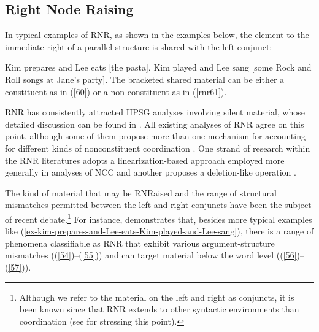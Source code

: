 {\subsection{Right Node Raising}

In typical examples of RNR, as shown in the examples below, the element to the immediate right of a parallel structure is shared with the left conjunct:

\eal
\label{ex-kim-prepares-and-Lee-eats-Kim-played-and-Lee-sang}
\ex  Kim prepares and Lee eats [the pasta].  \label{60}
\ex  Kim played and Lee sang [some Rock and Roll songs at Jane's party]. \label{rnr61}
\zl
%
The bracketed shared material can be either a constituent as in (\ref{60}) or a non-constituent as in (\ref{rnr61}).

RNR has consistently attracted HPSG analyses involving silent material, whose detailed discussion can be found
in . 
All existing analyses of RNR \citep{Abeille2016, Beavers2004, Chaves2008-in-lexicon, Chaves2014, Crysmann2003, Shiraishi2019, Yatabe2001, Yatabe2012} agree on this point,
although some of them propose more than one mechanism for accounting for different kinds of nonconstituent coordination \citep{Chaves2014, Yatabe2001, Yatabe2012, Yatabe2019}. One strand of research within the RNR literatures adopts a linearization-based approach employed more generally in analyses of NCC \citep{Yatabe2001, Yatabe2012} and another proposes a deletion-like operation \citep{Abeille2016, Chaves2014, Shiraishi2019}.

%

The kind of material that may be RNRaised and the range of structural mismatches permitted between the left and right conjuncts have been the subject of recent debate.\footnote{Although we refer to the material on the left and right as conjuncts, it is been known since \citet{Hudson1976, Hudson1989} that RNR extends to other syntactic environments than coordination (see \citealt{Chaves2014} for stressing this point).} For instance, \citet[839--840]{Chaves2014} demonstrates that, besides more typical examples like (\ref{ex-kim-prepares-and-Lee-eats-Kim-played-and-Lee-sang}),
 there is a range of phenomena classifiable as RNR that exhibit various argument-structure mismatches ((\ref{54})--(\ref{55})) and can target material below the word level ((\ref{56})--(\ref{57})).
%

}
